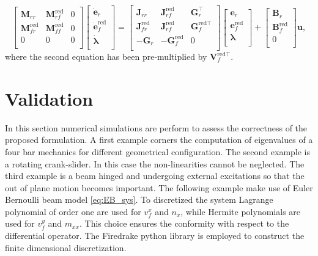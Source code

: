 \documentclass{svjour3}                     %
\begin{document}
\begin{equation}
\begin{bmatrix}
\bm{M}_{rr} & \bm{M}_{rf}^{\text{red}} & 0 \\ 
\bm{M}_{fr}^{\text{red}} & \bm{M}_{ff}^{\text{red}} & 0 \\
0 & 0 & 0 \\
\end{bmatrix}
\begin{bmatrix}
\dot{\bm{e}}_r \\ \dot{\bm{e}}_f^{\text{red}} \\ \dot{\bm{\lambda}} \\ 
\end{bmatrix} = 
\begin{bmatrix}
\bm{J}_{rr} & \bm{J}_{rf}^{\text{red}} & \bm{G}_r^\top \\ 
\bm{J}_{fr}^{\text{red}} & \bm{J}_{rf}^{\text{red}} & \bm{G}_f^{\text{red} \top} \\ 
-\bm{G}_r & -\bm{G}_f^{\text{red}} & 0 \\
\end{bmatrix}
\begin{bmatrix}
\bm{e}_r \\ \bm{e}_f^{\text{red}} \\ {\bm{\lambda}} \\ 
\end{bmatrix} + 
\begin{bmatrix}
\bm{B}_r \\ \bm{B}_f^{\text{red}} \\ 0 \\
\end{bmatrix}\bm{u},
\end{equation}
where the second equation has been pre-multiplied by $\bm{V}_f^{\text{red} \top}$.  

\section{Validation}
\label{sec:valid}

In this section numerical simulations are perform to assess the correctness of the proposed formulation. A first example corners the computation of eigenvalues of a four bar mechanics for different geometrical configuration. The second example is a rotating crank-slider. In this case the non-linearities cannot be neglected. The third example is a beam hinged and undergoing external excitations so that the out of plane motion becomes important. The following example make use of Euler Bernoulli beam model \eqref{eq:EB_sys}. To discretized the system Lagrange polynomial of order one are used for $v_f^x$ and $n_x$, while Hermite polynomials are used for $v_f^y$ and $m_{xx}$. This choice ensures the conformity with respect to the differential operator. The Firedrake python library \cite{rathgeber2017firedrake} is employed to construct the finite dimensional discretization.  
\end{document}
